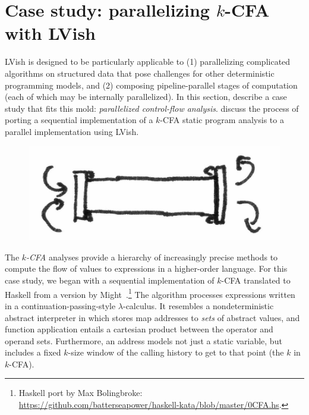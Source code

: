 \section{Case study: parallelizing $k$-CFA with LVish}\label{s:lvish-k-cfa}

LVish is designed to be particularly applicable to (1) parallelizing
complicated algorithms on structured data that pose challenges for
other deterministic programming models, and (2) composing
pipeline-parallel stages of computation (each of which may be
internally parallelized).  In this section,  describe a
case study that fits this mold: \emph{parallelized control-flow
  analysis}.   discuss the process of porting a
sequential implementation of a $k$-CFA static program analysis to a
parallel implementation using LVish.

\ifdefined\DISSERTATION
\begin{figure}
\vspace{-1.5em}
\begin{center}
  \includegraphics[scale=0.15]{../illustrations/flow2}
\end{center}
\vspace{-1em}
\end{figure}
\fi

The \emph{$k$-CFA} analyses provide a hierarchy of increasingly
precise methods to compute the flow of values to expressions in a
higher-order language.  For this case study, we began with a
sequential implementation of $k$-CFA translated to Haskell from a
version by Might~.\footnote{Haskell port by
  Max Bolingbroke:
  \url{https://github.com/batterseapower/haskell-kata/blob/master/0CFA.hs}.}
The algorithm processes expressions written in a
continuation-passing-style $\lambda$-calculus.  It resembles a
nondeterministic abstract interpreter in which stores map addresses to
\emph{sets} of abstract values, and function application entails a
cartesian product between the operator and operand sets.  Furthermore,
an address models not just a static variable, but includes a fixed
$k$-size window of the calling history to get to that point (the $k$
in $k$-CFA).

